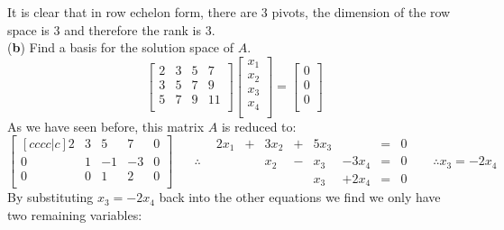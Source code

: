\documentclass[12pt]{article}
\begin{document}
It is clear that in row echelon form, there are $3$ pivots, the dimension of the row space is $3$ and therefore the rank is $3$.\\
\medskip
(\textbf{b}) Find a basis for the solution space of $A$.\\
$$
\begin{bmatrix}
   2 & 3 & 5 & 7\\
   3 & 5 & 7 & 9\\
   5 & 7 & 9 & 11\\
\end{bmatrix}
\begin{bmatrix}
   x_1 \\
   x_2 \\
   x_3 \\
   x_4 \\
\end{bmatrix}
=
\begin{bmatrix}
   0 \\
   0 \\
   0 \\
\end{bmatrix}
$$
As we have seen before, this matrix $A$ is reduced to:
$$
\begin{bmatrix}[cccc|c]
   2 & 3 & 5 & 7 & 0\\
   0 & 1 & -1 & -3 & 0\\
   0 & 0 & 1 & 2 & 0\\
\end{bmatrix}
\hspace{20pt}
\therefore
\begin{aligned}
&2x_1& + &3x_2& + &5x_3& &=& 0 \\
&& &x_2& - &x_3& - 3x_4 &=& 0 \\
&& && &x_3& + 2x_4 &=& 0
\end{aligned}
\hspace{20pt}
\therefore
x_3 = -2x_4
$$
By substituting $x_3=-2x_4$ back into the other equations we find we only have two remaining variables:
\end{document}
